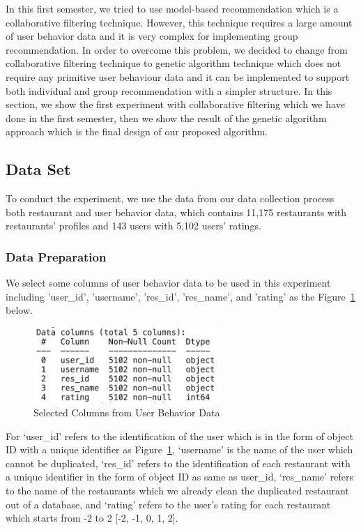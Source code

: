 \documentclass[12pt,oneside,openright,a4paper]{cpe-english-project}
\begin{document}
In this first semester, we tried to use model-based recommendation which is a collaborative filtering technique. However, this technique requires a large amount of user behavior data and it is very complex for implementing group recommendation. In order to overcome this problem, we decided to change from collaborative filtering technique to genetic algorithm technique which does not require any primitive user behaviour data and it can be implemented to support both individual and group recommendation with a simpler structure. In this section, we show the first experiment with collaborative filtering which we have done in the first semester, then we show the result of the genetic algorithm approach which is the final design of our proposed algorithm.

\subsection{Data Set}

To conduct the experiment, we use the data from our data collection process both restaurant and user behavior data, which contains 11,175 restaurants with restaurants’ profiles and 143 users with 5,102 users’ ratings.

\subsubsection{Data Preparation}

We select some columns of user behavior data to be used in this experiment including 'user\_id', 'username', 'res\_id', 'res\_name', and 'rating' as the Figure~\ref{fig:4SelectedColumnsfromUserBehaviorData} below.

\begin{figure}[H]\centering
\includegraphics[width=200pt]{./images/4SelectedColumnsfromUserBehaviorData.png}
\caption{Selected Columns from User Behavior Data}\label{fig:4SelectedColumnsfromUserBehaviorData}
\end{figure}

For ‘user\_id’ refers to the identification of the user which is in the form of object ID with a unique identifier as Figure~\ref{fig:4SelectedColumnsfromUserBehaviorData}, ‘username’ is the name of the user which cannot be duplicated, ‘res\_id’ refers to the identification of each restaurant with a unique identifier in the form of object ID as same as user\_id, ‘res\_name’ refers to the name of the restaurants which we already clean the duplicated restaurant out of a database, and ‘rating’ refers to the user’s rating for each restaurant which starts from -2 to 2 [-2, -1, 0, 1, 2].
\end{document}
